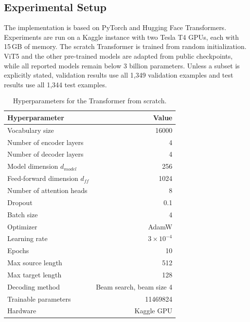 \documentclass[conference]{IEEEtran}
\begin{document}
\subsection{Experimental Setup}
The implementation is based on PyTorch and Hugging Face Transformers. Experiments are run on a Kaggle instance with two Tesla T4 GPUs, each with 15\,GB of memory. The scratch Transformer is trained from random initialization. ViT5 and the other pre-trained models are adapted from public checkpoints, while all reported models remain below 3 billion parameters. Unless a subset is explicitly stated, validation results use all 1,349 validation examples and test results use all 1,344 test examples.

\begin{table}[htbp]
\centering
\caption{Hyperparameters for the Transformer from scratch.}
\label{tab:hparams_scratch}
\begin{tabular}{lr}
\toprule
Hyperparameter & Value \\
\midrule
Vocabulary size & 16000 \\
Number of encoder layers & 4 \\
Number of decoder layers & 4 \\
Model dimension $d_{model}$ & 256 \\
Feed-forward dimension $d_{ff}$ & 1024 \\
Number of attention heads & 8 \\
Dropout & 0.1 \\
Batch size & 4 \\
Optimizer & AdamW \\
Learning rate & $3 \times 10^{-4}$ \\
Epochs & 10 \\
Max source length & 512 \\
Max target length & 128 \\
Decoding method & Beam search, beam size 4 \\
Trainable parameters & 11469824 \\
Hardware & Kaggle GPU \\
\bottomrule
\end{tabular}
\end{table}
\end{document}
